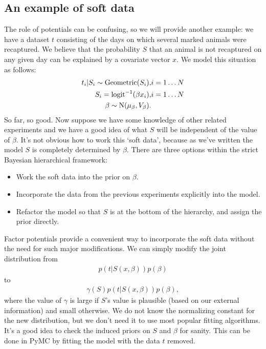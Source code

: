 \subsection{An example of soft data} 
The role of potentials can be confusing, so we will provide another example: we have a dataset $t$ consisting of the days on which several marked animals were recaptured. We believe that the probability $S$ that an animal is not recaptured on any given day can be explained by a covariate vector $x$. We model this situation as follows:
\begin{eqnarray*}
    t_i|S_i \sim \textup{Geometric}(S_i), & i=1\ldots N\\
    S_i = \textup{logit}^{-1}(\beta x_i), &i=1\ldots N\\
    \beta\sim \textup{N}(\mu_\beta, V_\beta).
\end{eqnarray*}
So far, so good. Now suppose we have some knowledge of other related experiments and we have a good idea of what $S$ will be independent of the value of $\beta$. It's not obvious how to work this `soft data', because as we've written the model $S$ is completely determined by $\beta$. There are three options within the strict Bayesian hierarchical framework:
\begin{itemize}
    \item Work the soft data into the prior on $\beta$.
    \item Incorporate the data from the previous experiments explicitly into the model.
    \item Refactor the model so that $S$ is at the bottom of the hierarchy, and assign the prior directly.
\end{itemize}

Factor potentials provide a convenient way to incorporate the soft data without the need for such major modifications. We can simply modify the joint distribution from
\begin{eqnarray*}
    p(t|S(x,\beta)) p(\beta)
\end{eqnarray*}
to
\begin{eqnarray*}
    \gamma(S) p(t|S(x,\beta)) p(\beta),
\end{eqnarray*}
where the value of $\gamma$ is large if $S$'s value is plausible (based on our external information) and small otherwise. We do not know the normalizing constant for the new distribution, but we don't need it to use most popular fitting algorithms. It's a good idea to check the induced priors on $S$ and $\beta$ for sanity. This can be done in PyMC by fitting the model with the data $t$ removed. 

